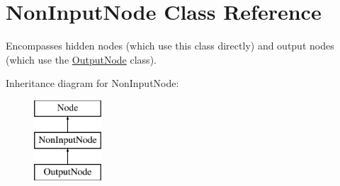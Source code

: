\hypertarget{class_non_input_node}{}\section{Non\+Input\+Node Class Reference}
\label{class_non_input_node}


Encompasses hidden nodes (which use this class directly) and output nodes (which use the \mbox{\hyperlink{class_output_node}{Output\+Node}} class).  


Inheritance diagram for Non\+Input\+Node\+:\begin{figure}[H]
\begin{center}
\leavevmode
\includegraphics[height=3.000000cm]{class_non_input_node}
\end{center}
\end{figure}
